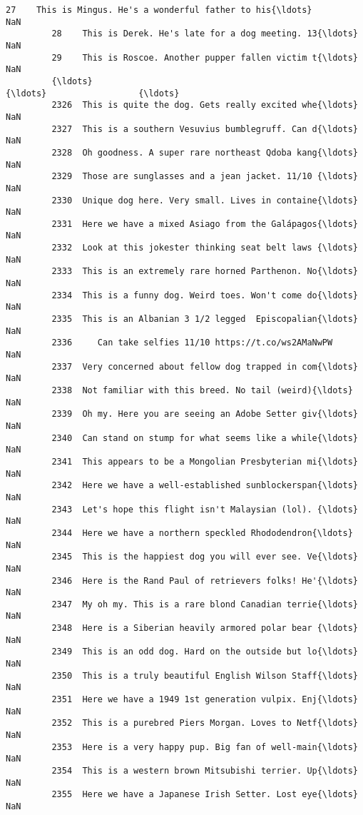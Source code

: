 \documentclass[11pt]{article}
\begin{document}
\begin{Verbatim}[commandchars=\\\{\}]
         27    This is Mingus. He's a wonderful father to his{\ldots}                  NaN   
         28    This is Derek. He's late for a dog meeting. 13{\ldots}                  NaN   
         29    This is Roscoe. Another pupper fallen victim t{\ldots}                  NaN   
         {\ldots}                                                 {\ldots}                  {\ldots}   
         2326  This is quite the dog. Gets really excited whe{\ldots}                  NaN   
         2327  This is a southern Vesuvius bumblegruff. Can d{\ldots}                  NaN   
         2328  Oh goodness. A super rare northeast Qdoba kang{\ldots}                  NaN   
         2329  Those are sunglasses and a jean jacket. 11/10 {\ldots}                  NaN   
         2330  Unique dog here. Very small. Lives in containe{\ldots}                  NaN   
         2331  Here we have a mixed Asiago from the Galápagos{\ldots}                  NaN   
         2332  Look at this jokester thinking seat belt laws {\ldots}                  NaN   
         2333  This is an extremely rare horned Parthenon. No{\ldots}                  NaN   
         2334  This is a funny dog. Weird toes. Won't come do{\ldots}                  NaN   
         2335  This is an Albanian 3 1/2 legged  Episcopalian{\ldots}                  NaN   
         2336     Can take selfies 11/10 https://t.co/ws2AMaNwPW                  NaN   
         2337  Very concerned about fellow dog trapped in com{\ldots}                  NaN   
         2338  Not familiar with this breed. No tail (weird){\ldots}                  NaN   
         2339  Oh my. Here you are seeing an Adobe Setter giv{\ldots}                  NaN   
         2340  Can stand on stump for what seems like a while{\ldots}                  NaN   
         2341  This appears to be a Mongolian Presbyterian mi{\ldots}                  NaN   
         2342  Here we have a well-established sunblockerspan{\ldots}                  NaN   
         2343  Let's hope this flight isn't Malaysian (lol). {\ldots}                  NaN   
         2344  Here we have a northern speckled Rhododendron{\ldots}                  NaN   
         2345  This is the happiest dog you will ever see. Ve{\ldots}                  NaN   
         2346  Here is the Rand Paul of retrievers folks! He'{\ldots}                  NaN   
         2347  My oh my. This is a rare blond Canadian terrie{\ldots}                  NaN   
         2348  Here is a Siberian heavily armored polar bear {\ldots}                  NaN   
         2349  This is an odd dog. Hard on the outside but lo{\ldots}                  NaN   
         2350  This is a truly beautiful English Wilson Staff{\ldots}                  NaN   
         2351  Here we have a 1949 1st generation vulpix. Enj{\ldots}                  NaN   
         2352  This is a purebred Piers Morgan. Loves to Netf{\ldots}                  NaN   
         2353  Here is a very happy pup. Big fan of well-main{\ldots}                  NaN   
         2354  This is a western brown Mitsubishi terrier. Up{\ldots}                  NaN   
         2355  Here we have a Japanese Irish Setter. Lost eye{\ldots}                  NaN   
         

\end{Verbatim}
\end{document}
